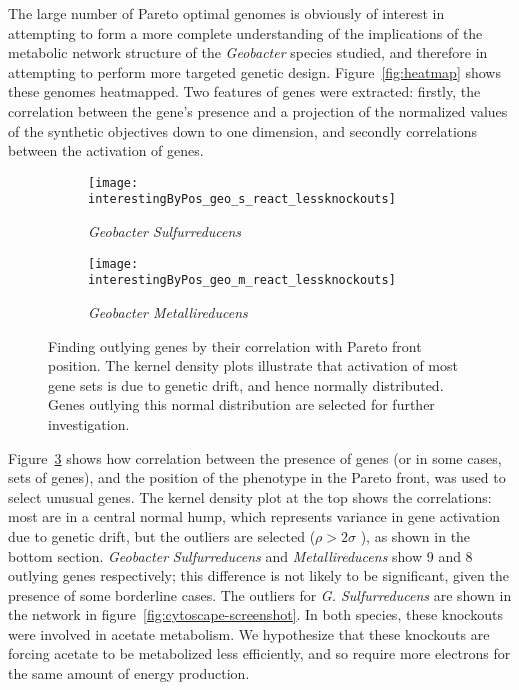 \documentclass[a4paper]{article}
\begin{document}
The large number of Pareto optimal genomes is obviously of interest in attempting to form a more complete understanding of the implications of the metabolic network structure of the {\it Geobacter} species studied, and therefore in attempting to perform more targeted genetic design. Figure~\ref{fig:heatmap} shows these genomes heatmapped. Two features of genes were extracted: firstly, the correlation between the gene’s presence and a projection of the normalized values of the synthetic objectives down to one dimension, and secondly correlations between the activation of genes. 

\begin{figure}[!htb]
	\begin{subfigure}[htb]{\textwidth}
                \texttt{[image: interestingByPos\_geo\_s\_react\_lessknockouts]}
                \caption{\it Geobacter Sulfurreducens}
                \label{fig:outlyinggenes:sul}
	\end{subfigure}
	\begin{subfigure}[htb]{\textwidth}
                \texttt{[image: interestingByPos\_geo\_m\_react\_lessknockouts]}
                \caption{\it Geobacter Metallireducens}
                \label{fig:outlyinggenes:met}
	\end{subfigure}
	\caption{Finding outlying genes by their correlation with Pareto front position. The kernel density plots illustrate that activation of most gene sets is due to genetic drift, and hence normally distributed. Genes outlying this normal distribution are selected for further investigation.}
	\label{fig:outlyinggenes}
\end{figure}

Figure~\ref{fig:outlyinggenes} shows how correlation between the presence of genes (or in some cases, sets of genes), and the position of the phenotype in the Pareto front, was used to select unusual genes. The kernel density plot at the top shows the correlations: most are in a central normal hump, which represents variance in gene activation due to genetic drift, but the outliers are selected (\( \rho > 2\sigma \) ), as shown in the bottom section. 
{\it Geobacter} {\it Sulfurreducens} and {\it Metallireducens} show 9 and 8 outlying genes respectively; this difference is not likely to be significant, given the presence of some borderline cases.
The outliers for {\it G. Sulfurreducens} are shown in the network in figure~\ref{fig:cytoscape-screenshot}. In both species, these knockouts were involved in acetate metabolism. We hypothesize that these knockouts are forcing acetate to be metabolized less efficiently, and so require more electrons for the same amount of energy production.
\end{document}
